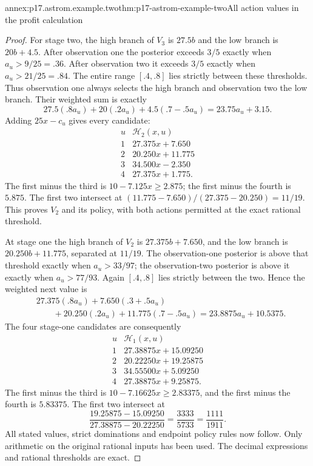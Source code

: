 \begin{annexitem}{annex:p17.astrom.example.two}{thm:p17-astrom-example-two}{All action values in the profit calculation}
\begin{proof}
For stage two, the high branch of \(V_3\) is
\(27.5b\) and the low branch is \(20b+4.5\).
After observation one the posterior exceeds \(3/5\)
exactly when \(a_u>9/25=.36\).
After observation two it exceeds \(3/5\) exactly
when \(a_u>21/25=.84\).
The entire range \([.4,.8]\) lies strictly between
these thresholds. Thus observation one always selects
the high branch and observation two the low branch.
Their weighted sum is exactly
\[
 27.5(.8a_u)+20(.2a_u)+4.5(.7-.5a_u)
                                      =23.75a_u+3.15.
\]
Adding \(25x-c_u\) gives every candidate:
\[
 \begin{array}{c|r}
 u&\mathcal H_2(x,u)\\ \hline
 1&27.375x+7.650\\
 2&20.250x+11.775\\
 3&34.500x-2.350\\
 4&27.375x+1.775 .
 \end{array}
\]
The first minus the third is \(10-7.125x\geq2.875\);
the first minus the fourth is \(5.875\).
The first two intersect at
\((11.775-7.650)/(27.375-20.250)=11/19\).
This proves \(V_2\) and its policy, with both actions
permitted at the exact rational threshold.

At stage one the high branch of \(V_2\) is
\(27.375b+7.650\), and the low branch is
\(20.250b+11.775\), separated at \(11/19\).
The observation-one posterior is above that threshold
exactly when \(a_u>33/97\); the observation-two
posterior is above it exactly when \(a_u>77/93\).
Again \([.4,.8]\) lies strictly between the two.
Hence the weighted next value is
\[
 \begin{split}
 &27.375(.8a_u)+7.650(.3+.5a_u)\\
 &\qquad+20.250(.2a_u)+11.775(.7-.5a_u)
                         =23.8875a_u+10.5375.
 \end{split}
\]
The four stage-one candidates are consequently
\[
 \begin{array}{c|r}
 u&\mathcal H_1(x,u)\\ \hline
 1&27.38875x+15.09250\\
 2&20.22250x+19.25875\\
 3&34.55500x+5.09250\\
 4&27.38875x+9.25875 .
 \end{array}
\]
The first minus the third is
\(10-7.16625x\geq2.83375\), and the first minus
the fourth is \(5.83375\). The first two intersect at
\[
       \frac{19.25875-15.09250}{27.38875-20.22250}
                       =\frac{3333}{5733}=\frac{1111}{1911}.
\]
All stated values, strict dominations and endpoint
policy rules now follow.
Only arithmetic on the original rational inputs has
been used. The decimal expressions and rational thresholds
are exact.
\end{proof}
\end{annexitem}

